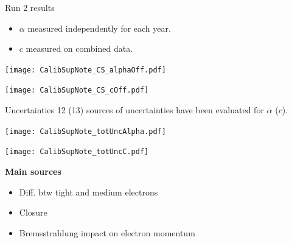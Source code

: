 \begin{frame}{Run 2 results}
  \begin{itemize}
  \item $\alpha$ measured independently for each year.
  \item $c$ measured on combined data.
    \end{itemize}

  \begin{minipage}{0.49\linewidth} 
    \texttt{[image: CalibSupNote\_CS\_alphaOff.pdf]}
  \end{minipage}
  \hfill
  \begin{minipage}{0.49\linewidth}
    \texttt{[image: CalibSupNote\_CS\_cOff.pdf]}
  \end{minipage}
\end{frame}
\begin{frame}{Uncertainties}
  12 (13) sources of uncertainties have been evaluated for $\alpha$ ($c$).

    \begin{minipage}{0.49\linewidth} 
      \texttt{[image: CalibSupNote\_totUncAlpha.pdf]}
  \end{minipage}
  \hfill
  \begin{minipage}{0.49\linewidth}
    \texttt{[image: CalibSupNote\_totUncC.pdf]}
  \end{minipage}

  \begin{center}
    \begin{minipage}{0.7\linewidth}
      \centering
      {\bf Main sources }
      \begin{itemize}
      \item Diff. btw tight and medium electrons
      \item Closure
      \item Bremsstrahlung impact on electron momentum
      \end{itemize}
    \end{minipage}
  \end{center}
\end{frame}
